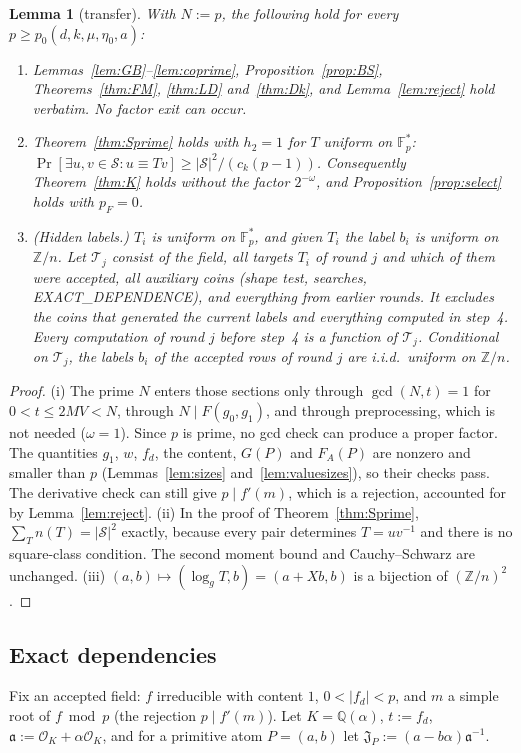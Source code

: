 \documentclass[11pt]{amsart}
\newtheorem{lemma}[theorem]{Lemma}
\theoremstyle{definition}
\newcommand{\Z}{\mathbb{Z}}
\newcommand{\Q}{\mathbb{Q}}
\newcommand{\F}{\mathbb{F}}
\newcommand{\cO}{\mathcal{O}}
\newcommand{\cS}{\mathcal{S}}
\newcommand{\cT}{\mathcal{T}}
\newcommand{\Prob}{\Pr}
\begin{document}
\begin{lemma}[transfer]\label{lem:DLtransfer}
With $N:=p$, the following hold for every $p\ge p_0(d,k,\mu,\eta_0,a)$:
\begin{enumerate}[label=(\roman*)]
\item Lemmas~\ref{lem:GB}--\ref{lem:coprime}, Proposition~\ref{prop:BS}, Theorems~\ref{thm:FM}, \ref{thm:LD} and~\ref{thm:Dk}, and
  Lemma~\ref{lem:reject} hold verbatim. No factor exit can occur.
\item Theorem~\ref{thm:Sprime} holds with $h_2=1$ for $T$ uniform on $\F_p^*$: $\Prob[\exists u,v\in\cS:u\equiv Tv]\ge|\cS|^2/(c_k(p-1))$.
  Consequently Theorem~\ref{thm:K} holds without the factor $2^{-\omega}$, and Proposition~\ref{prop:select} holds with $p_F=0$.
\item (Hidden labels.) $T_i$ is uniform on $\F_p^*$, and given $T_i$ the label $b_i$ is uniform on $\Z/n$. Let $\cT_j$ consist of the field,
  all targets $T_i$ of round $j$ and which of them were accepted, all auxiliary coins (shape test, searches, EXACT\_DEPENDENCE), and everything from
  earlier rounds. It excludes the coins that generated the current labels and everything computed in step~4. Every computation of round $j$
  before step~4 is a function of $\cT_j$. Conditional on $\cT_j$, the labels $b_i$ of the accepted rows of round $j$ are i.i.d.\ uniform on $\Z/n$.
\end{enumerate}
\end{lemma}

\begin{proof}
(i) The prime $N$ enters those sections only through $\gcd(N,t)=1$ for $0<t\le2MV<N$, through $N\mid F(g_0,g_1)$, and through preprocessing, which
is not needed ($\omega=1$). Since $p$ is prime, no gcd check can produce a proper factor. The quantities $g_1$, $w$, $f_d$, the content, $G(P)$ and
$F_A(P)$ are nonzero and smaller than $p$ (Lemmas~\ref{lem:sizes} and~\ref{lem:valuesizes}), so their checks pass. The derivative check can still give
$p\mid f'(m)$, which is a rejection, accounted for by Lemma~\ref{lem:reject}.
(ii) In the proof of Theorem~\ref{thm:Sprime}, $\sum_Tn(T)=|\cS|^2$ exactly, because every pair determines $T=uv^{-1}$ and there is no square-class
condition. The second moment bound and Cauchy--Schwarz are unchanged. (iii) $(a,b)\mapsto(\log_gT,b)=(a+Xb,b)$ is a bijection of $(\Z/n)^2$.
\end{proof}

\subsection{Exact dependencies}
Fix an accepted field: $f$ irreducible with content $1$, $0<|f_d|<p$, and $m$ a simple root of $f\bmod p$ (the rejection $p\mid f'(m)$). Let
$K=\Q(\alpha)$, $t:=f_d$, $\mathfrak a:=\cO_K+\alpha\cO_K$, and for a primitive atom $P=(a,b)$ let $\mathfrak J_P:=(a-b\alpha)\mathfrak a^{-1}$.
\end{document}
